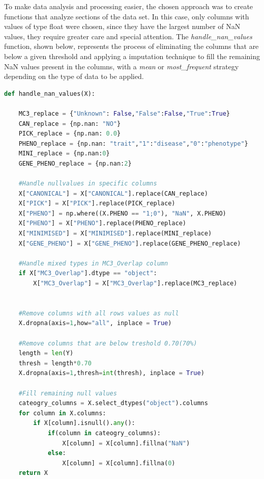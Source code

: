 To make data analysis and processing easier, the chosen approach was to create functions that analyze sections of the data set. In this case, only columns with values of type float were chosen, since they have the largest number of NaN values, they require greater care and special attention. The \textit{handle\_nan\_values} function, shown below, represents the process of eliminating the columns that are below a given threshold and applying a imputation technique to fill the remaining NaN values present in the columns, with a \textit{mean} or \textit{most\_frequent} strategy depending on the type of data to be applied.

\begin{lstlisting}[language=Python]
def handle_nan_values(X):
    
    MC3_replace = {"Unknown": False,"False":False,"True":True}
    CAN_replace = {np.nan: "NO"}
    PICK_replace = {np.nan: 0.0}
    PHENO_replace = {np.nan: "trait","1":"disease","0":"phenotype"}
    MINI_replace = {np.nan:0}
    GENE_PHENO_replace = {np.nan:2}
    
    #Handle nullvalues in specific columns
    X["CANONICAL"] = X["CANONICAL"].replace(CAN_replace)
    X["PICK"] = X["PICK"].replace(PICK_replace)
    X["PHENO"] = np.where((X.PHENO == "1;0"), "NaN", X.PHENO)
    X["PHENO"] = X["PHENO"].replace(PHENO_replace)
    X["MINIMISED"] = X["MINIMISED"].replace(MINI_replace)
    X["GENE_PHENO"] = X["GENE_PHENO"].replace(GENE_PHENO_replace)
    
    #Handle mixed types in MC3_Overlap column
    if X["MC3_Overlap"].dtype == "object":
        X["MC3_Overlap"] = X["MC3_Overlap"].replace(MC3_replace)
    
    
    #Remove columns with all rows values as null
    X.dropna(axis=1,how="all", inplace = True)
    
    #Remove columns that are below treshold 0.70(70%)
    length = len(Y)
    thresh = length*0.70
    X.dropna(axis=1,thresh=int(thresh), inplace = True)
         
    #Fill remaining null values
    cateogry_columns = X.select_dtypes("object").columns
    for column in X.columns:
        if X[column].isnull().any():
            if(column in cateogry_columns):
                X[column] = X[column].fillna("NaN")
            else:
                X[column] = X[column].fillna(0)
    return X
\end{lstlisting}

